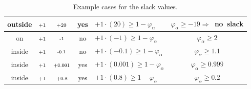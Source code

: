 \begin{frame}
\begin{table}[h]
{\begin{tabular}{cccclc}
outside  & $\mbox{\scriptsize+1}$                                                    & $\mbox{\scriptsize+20}$                                                        & yes                                                             & \mbox{\scriptsize$+1\cdot(20) \ge 1-\varphi_\alpha$}        & \mbox{\scriptsize $\varphi_\alpha \ge -19 \Rightarrow$ no slack}
\\ \hline
on  & $\mbox{\scriptsize+1}$                                                    & $\mbox{\scriptsize-1}$                                                        & no                                                             & \mbox{\scriptsize$+1\cdot(-1) \ge 1-\varphi_\alpha$}        & \mbox{\scriptsize$\varphi_\alpha \ge 2$}
\\ \hline
inside  & $\mbox{\scriptsize+1}$                                                    & $\mbox{\scriptsize-0.1}$                                                        & no                                                             & \mbox{\scriptsize$+1\cdot(-0.1) \ge 1-\varphi_\alpha$}        & \mbox{\scriptsize$\varphi_\alpha \ge 1.1$}
\\ \hline
inside  & $\mbox{\scriptsize+1}$                                                    & $\mbox{\scriptsize+0.001}$                                                        & yes                                                             & \mbox{\scriptsize$+1\cdot(0.001) \ge 1-\varphi_\alpha$}        & \mbox{\scriptsize$\varphi_\alpha \ge 0.999$}
\\ \hline
inside  & $\mbox{\scriptsize+1}$                                                    & $\mbox{\scriptsize+0.8}$                                                        & yes                                                             & \mbox{\scriptsize$+1\cdot(0.8) \ge 1-\varphi_\alpha$}        & \mbox{\scriptsize$\varphi_\alpha \ge 0.2$}
\\ \hline
\end{tabular}
}
\caption{Example cases for the slack values.}
\end{table}
\end{frame}


